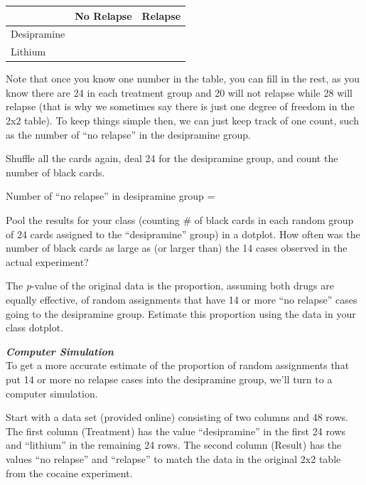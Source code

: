 \documentclass[twoside,openany]{tufte-book}
\begin{document}
\begin{table}[!ht]
\begin{center}
\begin{tabular}{|l|c|c|}
\hline
& No Relapse & Relapse\\
\hline
Desipramine &  &  \\
\hline
Lithium &  & \\
\hline
\end{tabular}
\end{center}
\end{table}

Note that once you know one number in the table, you can fill in the rest, as you know there are 24 in each treatment group and 20 will not relapse while 28 will relapse (that is why we sometimes say there is just one degree of freedom in the 2x2 table).  To keep things simple then, we can just keep track of one count, such as the number of ``no relapse'' in the desipramine group. 

Shuffle all the cards again, deal 24 for the desipramine group, and count the number of black cards. 

\begin{center}
Number of ``no relapse'' in desipramine group = \underline{\hspace{.5in}}
\end{center}

Pool the results for your class (counting \# of black cards in each random group of 24 cards assigned to the ``desipramine'' group) in a dotplot.  How often was the number of black cards as large as (or larger than) the 14 cases observed in the actual experiment? 

The \textit{p}-value of the original data is the proportion, assuming both drugs are equally effective, of random assignments that have 14 or more ``no relapse'' cases going to the desipramine group.  Estimate this proportion using the data in your class dotplot. \\
\vspace{12pt}

\noindent\textbf{\textit{Computer Simulation}}\\
\vspace{3pt}
To get a more accurate estimate of the proportion of random assignments that put 14 or more no relapse cases into the desipramine group, we'll turn to a computer simulation. 

Start with a data set (provided online) consisting of two columns and 48 rows.  The first column (Treatment) has the value ``desipramine'' in the first 24 rows and ``lithium'' in the remaining 24 rows.  The second column (Result) has the values ``no relapse'' and ``relapse'' to match the data in the original 2x2 table from the cocaine experiment. 
\end{document}

